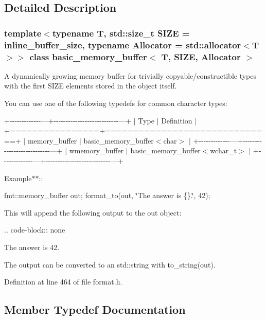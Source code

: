 \subsection{Detailed Description}
\subsubsection*{template$<$typename T, std\+::size\+\_\+t S\+I\+ZE = inline\+\_\+buffer\+\_\+size, typename Allocator = std\+::allocator$<$\+T$>$$>$\newline
class basic\+\_\+memory\+\_\+buffer$<$ T, S\+I\+Z\+E, Allocator $>$}

A dynamically growing memory buffer for trivially copyable/constructible types with the first {\ttfamily S\+I\+ZE} elements stored in the object itself.

You can use one of the following typedefs for common character types\+:

+-\/-\/-\/-\/-\/-\/-\/-\/-\/-\/-\/-\/-\/---+-\/-\/-\/-\/-\/-\/-\/-\/-\/-\/-\/-\/-\/-\/-\/-\/-\/-\/-\/-\/-\/-\/-\/-\/-\/-\/-\/---+ $\vert$ Type $\vert$ Definition $\vert$ +================+==============================+ $\vert$ memory\+\_\+buffer $\vert$ basic\+\_\+memory\+\_\+buffer$<$char$>$ $\vert$ +-\/-\/-\/-\/-\/-\/-\/-\/-\/-\/-\/-\/-\/---+-\/-\/-\/-\/-\/-\/-\/-\/-\/-\/-\/-\/-\/-\/-\/-\/-\/-\/-\/-\/-\/-\/-\/-\/-\/-\/-\/---+ $\vert$ wmemory\+\_\+buffer $\vert$ basic\+\_\+memory\+\_\+buffer$<$wchar\+\_\+t$>$ $\vert$ +-\/-\/-\/-\/-\/-\/-\/-\/-\/-\/-\/-\/-\/---+-\/-\/-\/-\/-\/-\/-\/-\/-\/-\/-\/-\/-\/-\/-\/-\/-\/-\/-\/-\/-\/-\/-\/-\/-\/-\/-\/---+

Example$\ast$$\ast$\+:\+:

fmt\+::memory\+\_\+buffer out; format\+\_\+to(out, \char`\"{}\+The answer is \{\}.\char`\"{}, 42);

This will append the following output to the {\ttfamily out} object\+:

.. code-\/block\+:\+: none

The answer is 42.

The output can be converted to an {\ttfamily std\+::string} with {\ttfamily to\+\_\+string(out)}.  

Definition at line 464 of file format.\+h.



\subsection{Member Typedef Documentation}
\mbox{\label{classbasic__memory__buffer_a4b506ce1f0e45eab07a90eb38ce6089a}} 
